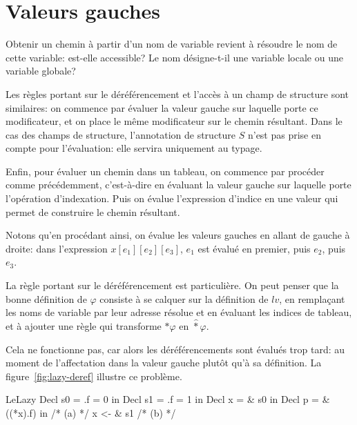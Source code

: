 \section{Valeurs gauches}
\label{sec:eval-lv}


Obtenir un chemin à partir d'un nom de variable revient à résoudre le nom de
cette variable: est-elle accessible? Le nom désigne-t-il une variable locale
ou une variable globale?

\begin{mathpar}
\end{mathpar}

Les règles portant sur le déréférencement et l'accès à un champ de structure
sont similaires: on commence par évaluer la valeur gauche sur laquelle porte ce
modificateur, et on place le même modificateur sur le chemin résultant. Dans le
cas des champs de structure, l'annotation de structure $S$ n'est pas prise
en compte pour l'évaluation: elle servira uniquement au typage.

\begin{mathpar}
\end{mathpar}

Enfin, pour évaluer un chemin dans un tableau, on commence par procéder comme
précédemment, c'est-à-dire en évaluant la valeur gauche sur laquelle porte
l'opération d'indexation. Puis on évalue l'expression d'indice en une valeur qui
permet de construire le chemin résultant.

\begin{mathpar}
\end{mathpar}

Notons qu'en procédant ainsi, on évalue les valeurs gauches en allant de gauche
à droite: dans l'expression $x[e_1][e_2][e_3]$, $e_1$ est évalué en premier,
puis $e_2$, puis $e_3$.

La règle portant sur le déréférencement est particulière. On peut penser que la
bonne définition de $φ$ consiste à se calquer sur la définition de $lv$, en
remplaçant les noms de variable par leur adresse résolue et en évaluant les
indices de tableau, et à ajouter une règle qui transforme $*φ$ en
$\widehat{*}φ$.

Cela ne fonctionne pas, car alors les déréférencements sont évalués trop tard:
au moment de l'affectation dans la valeur gauche plutôt qu'à sa définition. La
figure~\ref{fig:lazy-deref} illustre ce problème.

\begin{SaveVerbatim}[]{LeLazy}
Decl s0 = { .f = 0 } in
Decl s1 = { .f = 1 } in
Decl x  = & s0 in
Decl p = & ((*x).f) in
/* (a) */
x <- & s1
/* (b) */
\end{SaveVerbatim}

